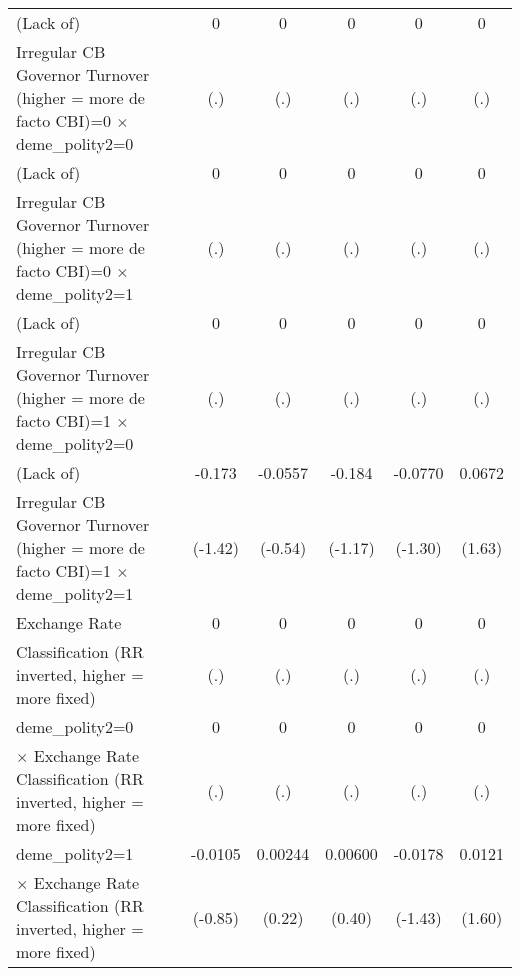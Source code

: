 {\begin{tabular}{l*{5}{c}}
\addlinespace
(Lack of)       &        0         &        0         &        0         &        0         &        0         \\
Irregular CB Governor Turnover (higher = more de facto CBI)=0 $\times$ deme\_polity2=0&      (.)         &      (.)         &      (.)         &      (.)         &      (.)         \\
\addlinespace
(Lack of)       &        0         &        0         &        0         &        0         &        0         \\
Irregular CB Governor Turnover (higher = more de facto CBI)=0 $\times$ deme\_polity2=1&      (.)         &      (.)         &      (.)         &      (.)         &      (.)         \\
\addlinespace
(Lack of)       &        0         &        0         &        0         &        0         &        0         \\
Irregular CB Governor Turnover (higher = more de facto CBI)=1 $\times$ deme\_polity2=0&      (.)         &      (.)         &      (.)         &      (.)         &      (.)         \\
\addlinespace
(Lack of)       &   -0.173         &  -0.0557         &   -0.184         &  -0.0770         &   0.0672         \\
Irregular CB Governor Turnover (higher = more de facto CBI)=1 $\times$ deme\_polity2=1&  (-1.42)         &  (-0.54)         &  (-1.17)         &  (-1.30)         &   (1.63)         \\
\addlinespace
Exchange Rate   &        0         &        0         &        0         &        0         &        0         \\
Classification (RR inverted, higher = more fixed)&      (.)         &      (.)         &      (.)         &      (.)         &      (.)         \\
\addlinespace
deme\_polity2=0  &        0         &        0         &        0         &        0         &        0         \\
$\times$ Exchange Rate Classification (RR inverted, higher = more fixed)&      (.)         &      (.)         &      (.)         &      (.)         &      (.)         \\
\addlinespace
deme\_polity2=1  &  -0.0105         &  0.00244         &  0.00600         &  -0.0178         &   0.0121         \\
$\times$ Exchange Rate Classification (RR inverted, higher = more fixed)&  (-0.85)         &   (0.22)         &   (0.40)         &  (-1.43)         &   (1.60)         \\

\end{tabular}}
